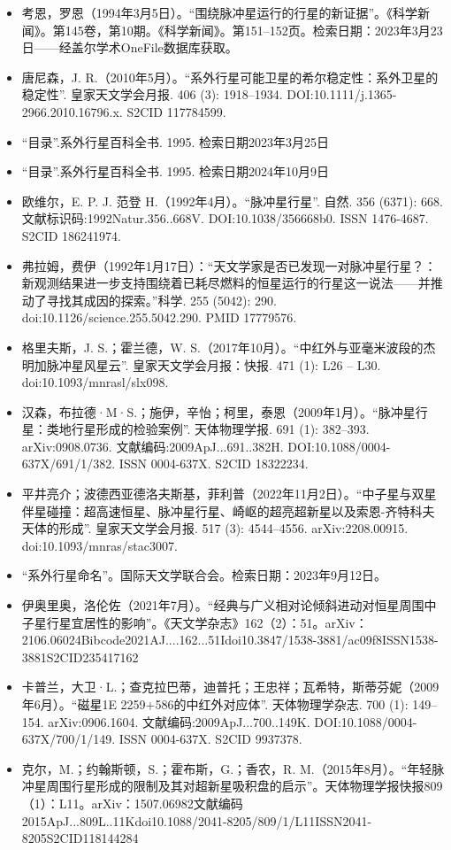 \begin{itemize}
\item 考恩，罗恩（1994年3月5日）。“围绕脉冲星运行的行星的新证据”。《科学新闻》。第145卷，第10期。《科学新闻》。第151–152页。检索日期：2023年3月23日——经盖尔学术OneFile数据库获取。
\item 唐尼森，J. R.（2010年5月）。“系外行星可能卫星的希尔稳定性：系外卫星的稳定性”. 皇家天文学会月报. 406 (3): 1918–1934. DOI:10.1111/j.1365-2966.2010.16796.x. S2CID 117784599.
\item “目录”.系外行星百科全书. 1995. 检索日期2023年3月25日
\item “目录”.系外行星百科全书. 1995. 检索日期2024年10月9日
\item 欧维尔，E. P. J. 范登 H.（1992年4月）。“脉冲星行星”. 自然. 356 (6371): 668. 文献标识码:1992Natur.356..668V. DOI:10.1038/356668b0. ISSN 1476-4687. S2CID 186241974.
\item 弗拉姆，费伊（1992年1月17日）：“天文学家是否已发现一对脉冲星行星？：新观测结果进一步支持围绕着已耗尽燃料的恒星运行的行星这一说法——并推动了寻找其成因的探索。”科学. 255 (5042): 290. doi:10.1126/science.255.5042.290. PMID 17779576.
\item 格里夫斯，J. S.；霍兰德，W. S.（2017年10月）。“中红外与亚毫米波段的杰明加脉冲星风星云”. 皇家天文学会月报：快报. 471 (1): L26 – L30. doi:10.1093/mnrasl/slx098.
\item 汉森，布拉德·M·S.；施伊，辛怡；柯里，泰恩（2009年1月）。“脉冲星行星：类地行星形成的检验案例”. 天体物理学报. 691 (1): 382–393. arXiv:0908.0736. 文献编码:2009ApJ...691..382H. DOI:10.1088/0004-637X/691/1/382. ISSN 0004-637X. S2CID 18322234.
\item 平井亮介；波德西亚德洛夫斯基，菲利普（2022年11月2日）。“中子星与双星伴星碰撞：超高速恒星、脉冲星行星、崎岖的超亮超新星以及索恩-齐特科夫天体的形成”. 皇家天文学会月报. 517 (3): 4544–4556. arXiv:2208.00915. doi:10.1093/mnras/stac3007.
\item “系外行星命名”。国际天文学联合会。检索日期：2023年9月12日。
\item 伊奥里奥，洛伦佐（2021年7月）。“经典与广义相对论倾斜进动对恒星周围中子星行星宜居性的影响”。《天文学杂志》162（2）：51。arXiv：2106.06024Bibcode2021AJ....162...51Idoi10.3847/1538-3881/ac09f8ISSN1538-3881S2CID235417162
\item 卡普兰，大卫·L.；查克拉巴蒂，迪普托；王忠祥；瓦希特，斯蒂芬妮（2009年6月）。“磁星1E 2259+586的中红外对应体”. 天体物理学杂志. 700 (1): 149–154. arXiv:0906.1604. 文献编码:2009ApJ...700..149K. DOI:10.1088/0004-637X/700/1/149. ISSN 0004-637X. S2CID 9937378.
\item 克尔，M.；约翰斯顿，S.；霍布斯，G.；香农，R. M.（2015年8月）。“年轻脉冲星周围行星形成的限制及其对超新星吸积盘的启示”。天体物理学报快报809（1）：L11。arXiv：1507.06982文献编码2015ApJ...809L..11Kdoi10.1088/2041-8205/809/1/L11ISSN2041-8205S2CID118144284

\end{itemize}
